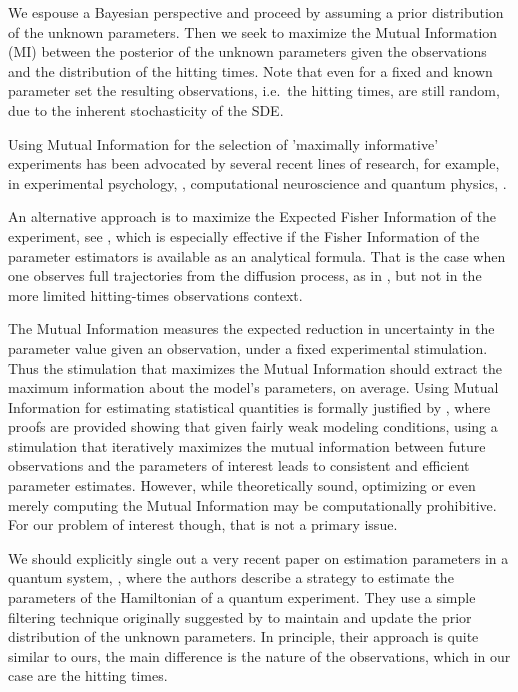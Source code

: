 We espouse a Bayesian perspective and proceed by assuming a prior
distribution of the unknown parameters. Then we seek to maximize the Mutual
Information (MI) between the posterior of the unknown parameters given the
observations and the distribution of the hitting times. Note that even for a
fixed and known parameter set the resulting observations, i.e.\ the hitting
times, are still random, due to the inherent stochasticity of the SDE. 

Using Mutual Information for the selection of 'maximally informative'
experiments has been advocated by several recent lines of research, for example,
in experimental psychology, \cite{Cavagnaro2010,Myung2013}, computational
neuroscience \cite{Paninski2006a,Paninski2005,Lewi2009} and quantum physics,
\cite{Granade2012}.
 
An alternative approach is to maximize the Expected Fisher Information of the
experiment, see \cite{Hooker2015}, which is especially effective if the Fisher
Information of the parameter estimators is available as an analytical formula.
That is the case when one observes full trajectories from the diffusion process,
as in \cite{Hooker2015}, but not in the more limited hitting-times observations
context.
 
The Mutual Information measures the expected reduction in uncertainty in the
parameter value given an observation, under a fixed experimental stimulation.
Thus the stimulation that maximizes the Mutual Information should extract the
maximum information about the model's parameters, on average. Using Mutual
Information for estimating statistical quantities is formally justified by
\cite{Paninski2005}, where proofs are provided showing that given fairly weak
modeling conditions, using a stimulation that iteratively maximizes the mutual
information between future observations and the parameters of interest leads to
consistent and efficient parameter estimates. However, while theoretically
sound, optimizing or even merely computing the Mutual Information may be
computationally prohibitive. For our problem of interest though, that is not a
primary issue.

We should explicitly single out a very recent paper on estimation
parameters in a quantum system,  
\cite{Granade2012}, where the authors describe a strategy to estimate
the parameters of the Hamiltonian of a quantum experiment. They use a simple
filtering technique originally suggested by \cite{Liu2001} to maintain and
update the prior distribution of the unknown parameters. In principle, their
approach is quite similar to ours, the main difference is the nature of the
observations, which in our case are the hitting times.

